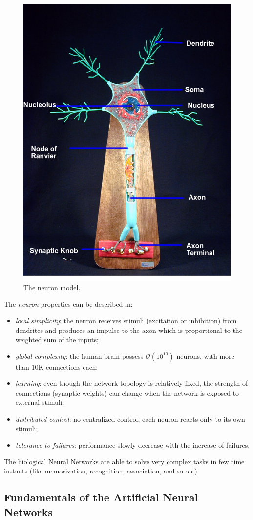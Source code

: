 \begin{figure}[t]
\centering
\includegraphics[width=0.4\linewidth]{img/neuron_model}
\caption{The neuron model.}
\label{fig:neuron}
\end{figure}

The \textit{neuron} properties can be described in:
\begin{itemize}
\item \textit{local simplicity}: the neuron receives stimuli (excitation or inhibition) from dendrites and produces an impulse to the axon which is proportional to the weighted sum of the inputs;
\item \textit{global complexity}: the human brain possess 
$\mathcal{O}(10^{10})$ 
neurons, with more than 10K connections each;
\item \textit{learning}: even though the network topology is relatively fixed, the strength of connections (synaptic weights) can change when the network is exposed to external stimuli;
\item \textit{distributed control}: no centralized control, each neuron reacts only to its own stimuli;
\item \textit{tolerance to failures}: performance slowly decrease with the increase of failures.
\end{itemize}

The biological Neural Networks are able to solve very complex tasks in few time instants (like memorization, recognition, association, and so on.)

\subsection{Fundamentals of the Artificial Neural Networks} 

